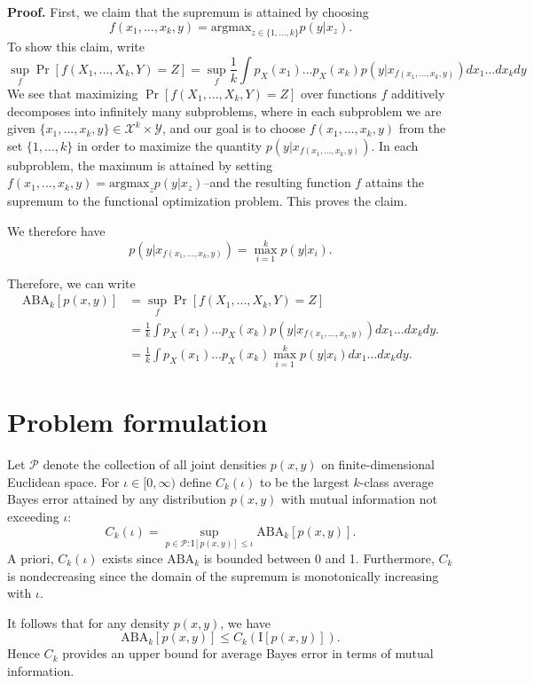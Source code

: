 \documentclass[12pt]{article}
\begin{document}
\noindent\textbf{Proof.}
First, we claim that the supremum is attained by choosing
\[
f(x_1,...,x_k, y) = \text{argmax}_{z \in \{1,...,k\}} p(y|x_z).
\]
To show this claim, write
\[
\sup_f \Pr[f(X_1,...,X_k, Y) = Z] = \sup_f \frac{1}{k}\int p_X(x_1)\hdots p_X(x_k) p(y|x_{f(x_1,...,x_k, y)}) dx_1\hdots dx_k dy
\]
We see that maximizing $\Pr[f(X_1,...,X_k, Y) = Z]$ over functions $f$
additively decomposes into infinitely many subproblems, where in each
subproblem we are given $\{x_1,...,x_k,
y\} \in \mathcal{X}^k \times \mathcal{Y}$, and our goal is to choose
$f(x_1,...,x_k, y)$ from the set $\{1,...,k\}$ in order to maximize
the quantity $p(y|x_{f(x_1,...,x_k, y)})$.  In each subproblem,
the maximum is attained by setting $f(x_1,...,x_k,y) = \text{argmax}_z
p(y|x_z)$--and the resulting function $f$ attains the supremum to the
functional optimization problem.  This proves the claim.

We therefore have
\[
p(y|x_{f(x_1,...,x_k, y)}) = \max_{i=1}^k p(y|x_i).
\]

Therefore, we can write
\begin{align*}
\text{ABA}_k[p(x, y)] &= \sup_f \Pr[f(X_1,...,X_k, Y) = Z]
\\&=  \frac{1}{k} \int p_X(x_1)\hdots p_X(x_k) p(y|x_{f(x_1,...,x_k, y)})  dx_1\hdots dx_k dy.
\\&=  \frac{1}{k} \int p_X(x_1)\hdots p_X(x_k) \max_{i=1}^k p(y|x_i)  dx_1\hdots dx_k dy.
\end{align*}


\section{Problem formulation}

Let $\mathcal{P}$ denote the collection of all joint densities $p(x,
y)$ on finite-dimensional Euclidean space.  For $\iota \in [0,\infty)$
define $C_k(\iota)$ to be the largest $k$-class average Bayes error
attained by any distribution $p(x,y)$ with mutual information not
exceeding $\iota$:
\[
C_k(\iota) = \sup_{p \in \mathcal{P}: \text{I}[p(x,y)] \leq \iota} \text{ABA}_k[p(x,y)].
\]
A priori, $C_k(\iota)$ exists since $\text{ABA}_k$ is bounded between
0 and 1.  Furthermore, $C_k$ is nondecreasing since the domain of the
supremum is monotonically increasing with $\iota$.

It follows that for any density $p(x,
y)$, we have
\[
\text{ABA}_k[p(x,y)] \leq C_k(\text{I}[p(x,y)]).
\]
Hence $C_k$ provides an upper bound for average Bayes error in terms of mutual information.
\end{document}
